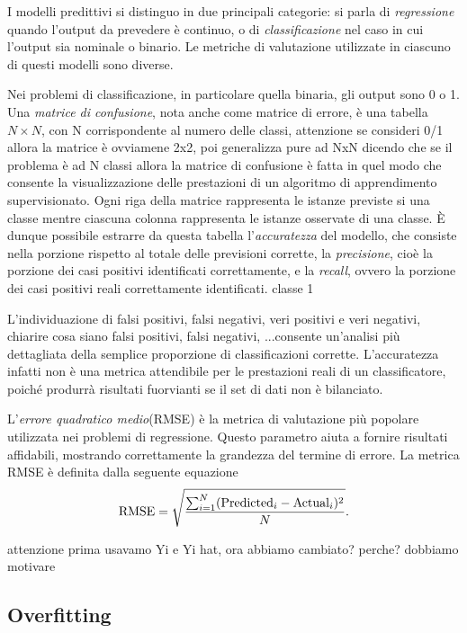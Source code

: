 I modelli predittivi si distinguo in due principali categorie: si parla di \emph{regressione} quando l'output da prevedere è continuo, o di \emph{classificazione} nel caso in cui l'output sia nominale o binario. Le metriche di valutazione utilizzate in ciascuno di questi modelli sono diverse.

Nei problemi di classificazione, in particolare quella binaria, gli output sono 0 o 1. 
Una \emph{matrice di confusione}, nota anche come matrice di errore, è una tabella $N \times N$, con N corrispondente al numero delle classi,{\color{red} attenzione se consideri 0/1 allora la matrice è ovviamene 2x2, poi generalizza pure ad NxN dicendo che se il problema è ad N classi allora la matrice di confusione è fatta in quel modo} che consente la visualizzazione delle prestazioni di un algoritmo di apprendimento supervisionato. Ogni riga della matrice rappresenta le istanze previste si una classe mentre ciascuna colonna rappresenta le istanze osservate di una classe. 
È dunque possibile estrarre da questa tabella l'\emph{accuratezza} del modello, che consiste nella porzione rispetto al totale delle previsioni corrette, la \emph{precisione}, cioè la porzione dei casi positivi identificati correttamente, e la \emph{recall}, ovvero la porzione dei casi positivi reali correttamente identificati. {\color{red} classe 1}

L'individuazione di falsi positivi, falsi negativi, veri positivi e veri negativi, {\color{red} chiarire cosa siano falsi positivi, falsi negativi, ...}consente un'analisi più dettagliata della semplice proporzione di classificazioni corrette. L'accuratezza infatti non è una metrica attendibile per le prestazioni reali di un classificatore, poiché produrrà risultati fuorvianti se il set di dati non è bilanciato.

L'\emph{errore quadratico medio}(RMSE) è la metrica di valutazione più popolare utilizzata nei problemi di regressione. Questo parametro aiuta a fornire risultati affidabili, mostrando correttamente la grandezza del termine di errore.
La metrica RMSE è definita dalla seguente equazione
\begin{equation}
	\operatorname{RMSE} = \sqrt{\frac{\sum_{i=1}^{N}(\mbox{Predicted}_i - \mbox{Actual}_i)^2}{N}} \mbox{.}
	\label{eq:rmse}
\end{equation}

{\color{red} attenzione prima usavamo Yi e Yi hat, ora abbiamo cambiato? perche? dobbiamo motivare}
\subsection{Overfitting}
\label{subsec:overfitting}

